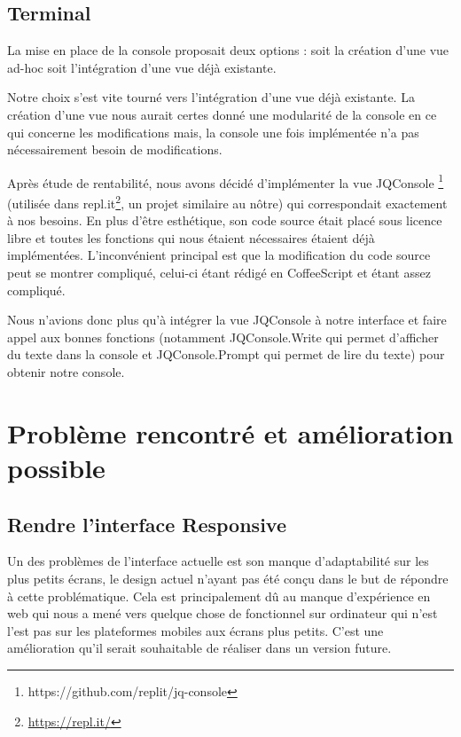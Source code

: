 \subsection{Terminal}
\label{subsec-terminal}

\par La mise en place de la console proposait deux options : soit la création d'une vue ad-hoc soit l'intégration d'une vue déjà existante.

\par Notre choix s'est vite tourné vers l'intégration d'une vue déjà existante. La création d'une vue nous aurait certes donné une modularité de la console en ce qui concerne les modifications mais, la console une fois implémentée n'a pas nécessairement besoin de modifications.

\par Après étude de rentabilité, nous avons décidé d'implémenter la vue JQConsole \footnote{https://github.com/replit/jq-console} (utilisée dans repl.it\footnote{\url{https://repl.it/}}, un projet similaire au nôtre) qui correspondait exactement à nos besoins. En plus d'être esthétique, son code source était placé sous licence libre et toutes les fonctions qui nous étaient nécessaires étaient déjà implémentées. L'inconvénient principal est que la modification du code source peut se montrer compliqué, celui-ci étant rédigé en CoffeeScript et étant assez compliqué.

\par Nous n'avions donc plus qu'à intégrer la vue JQConsole à notre interface et faire appel aux bonnes fonctions (notamment JQConsole.Write qui permet d'afficher du texte dans la console et JQConsole.Prompt qui permet de lire du texte) pour obtenir notre console.

\section{Problème rencontré et amélioration possible}

\subsection{Rendre l'interface Responsive}
Un des problèmes de l'interface actuelle est son manque d'adaptabilité sur les plus petits écrans, le design actuel n'ayant pas été conçu dans le but de répondre à cette problématique. Cela est principalement dû au manque d'expérience en web qui nous a mené vers quelque chose de fonctionnel sur ordinateur qui n'est l'est pas sur les plateformes mobiles aux écrans plus petits. C'est une amélioration qu'il serait souhaitable de réaliser dans un version future.

